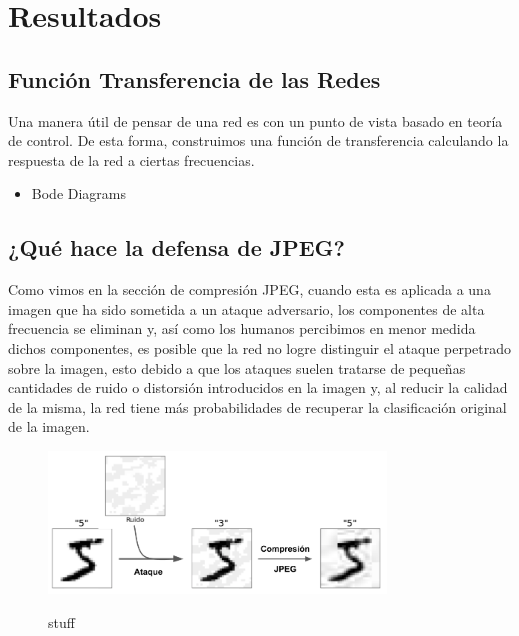 \section{Resultados}
\subsection{Función Transferencia de las Redes}
Una manera útil de pensar de una red es con un punto de vista basado en teoría de control. De esta forma, construimos una función de transferencia calculando la respuesta de la red a ciertas frecuencias. 
\begin{itemize}
    \item Bode Diagrams
\end{itemize}
\subsection{¿Qué hace la defensa de JPEG?}

Como vimos en la sección de compresión JPEG, cuando esta es aplicada a una imagen que ha sido sometida a un ataque adversario, los componentes de alta frecuencia se eliminan y, así como los humanos percibimos en menor medida dichos componentes, es posible que la red no logre distinguir el ataque perpetrado sobre la imagen, esto debido a que los ataques suelen tratarse de pequeñas cantidades de ruido o distorsión introducidos en la imagen y, al reducir la calidad de la misma, la red tiene más probabilidades de recuperar la clasificación original de la imagen.

\begin{figure}[h!]
    \centering
    \includegraphics[width=0.8\textwidth]{images/jpeg/jpegdefense_example.png}
    \label{jpegexample}
    \caption{stuff}
\end{figure}

